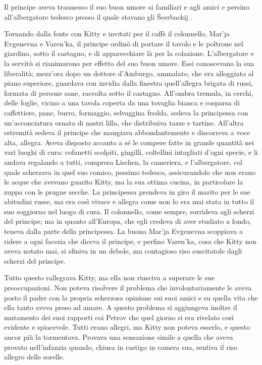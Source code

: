 \label{xxxv} 

Il principe aveva trasmesso il suo buon umore ai familiari e agli amici e persino all'albergatore tedesco presso il quale stavano gli Šcerbackij . 

Tornando dalla fonte con Kitty e invitati per il caffè il colonnello, Mar'ja Evgenevna e Varen'ka, il principe ordinò di portare il tavolo e le poltrone nel giardino, sotto il castagno, e di apparecchiare là per la colazione. L'albergatore e la servitù si rianimarono per effetto del suo buon umore. Essi conoscevano la sua liberalità; mezz'ora dopo un dottore d'Amburgo, ammalato, che era alloggiato al piano superiore, guardava con invidia dalla finestra quell'allegra brigata di russi, formata di persone sane, raccolta sotto il castagno. All'ombra tremula, in cerchi, delle foglie, vicino a una tavola coperta da una tovaglia bianca e cosparsa di caffettiere, pane, burro, formaggio, selvaggina fredda, sedeva la principessa con un'acconciatura ornata di nastri lilla, che distribuiva tazze e tartine. All'altra estremità sedeva il principe che mangiava abbondantemente e discorreva a voce alta, allegra. Aveva disposto accanto a sé le compere fatte in grande quantità nei vari luoghi di cura: cofanetti scolpiti, gingilli, coltellini intagliati d'ogni specie, e li andava regalando a tutti, compresa Lischen, la cameriera, e l'albergatore, col quale scherzava in quel suo comico, pessimo tedesco, assicurandolo che non erano le acque che avevano guarito Kitty, ma la sua ottima cucina, in particolare la zuppa con le prugne secche. La principessa prendeva in giro il marito per le sue abitudini russe, ma era così vivace e allegra come non lo era mai stata in tutto il suo soggiorno nel luogo di cura. Il colonnello, come sempre, sorrideva agli scherzi del principe; ma in quanto all'Europa, che egli credeva di aver studiato a fondo, teneva dalla parte della principessa. La buona Mar'ja Evgenevna scoppiava a ridere a ogni facezia che diceva il principe, e perfino Varen'ka, cosa che Kitty non aveva notato mai, si sfiniva in un debole, ma contagioso riso suscitatole dagli scherzi del principe. 

Tutto questo rallegrava Kitty, ma ella non riusciva a superare le sue preoccupazioni. Non poteva risolvere il problema che involontariamente le aveva posto il padre con la propria scherzosa opinione sui suoi amici e su quella vita che ella tanto aveva preso ad amare. A questo problema si aggiungeva inoltre il mutamento dei suoi rapporti coi Petrov che quel giorno si era rivelato così evidente e spiacevole. Tutti erano allegri, ma Kitty non poteva esserlo, e questo ancor più la tormentava. Provava una sensazione simile a quella che aveva provato nell'infanzia quando, chiusa in castigo in camera sua, sentiva il riso allegro delle sorelle. 

